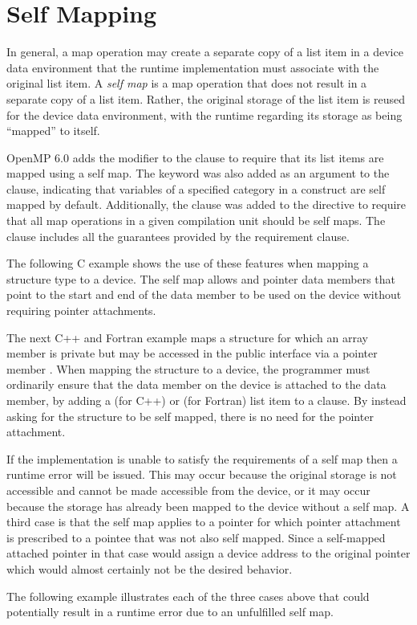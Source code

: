 \section{Self Mapping}
\label{sec:self_mapping}


In general, a map operation may create a separate copy of a list item in a
device data environment that the runtime implementation must associate with the
original list item. A \emph{self map} is a map operation that does not result in a
separate copy of a list item. Rather, the original storage of the list item is
reused for the device data environment, with the runtime regarding its storage
as being ``mapped'' to itself.

OpenMP 6.0 adds the  modifier to the  clause to require
that its list items are mapped using a self map.  The  keyword was
also added as an argument to the  clause, indicating that
variables of a specified category in a  construct are self mapped
by default. Additionally, the  clause was added to the
 directive to require that all map operations in a given
compilation unit should be self maps. The  clause includes all
the guarantees provided by the  requirement clause.

The following C example shows the use of these features when mapping a structure
type to a device. The self map allows  and  pointer
data members that point to the start and end of the  data member to
be used on the device without requiring pointer attachments.


The next C++ and Fortran example maps a structure for which an array member
 is private but may be accessed in the public interface via a
pointer member . When mapping the structure to a device, the
programmer must ordinarily ensure that the  data member on the device
is attached to the  data member, by adding a 
(for C++) or  (for Fortran) list item to a 
clause. By instead asking for the structure to be self mapped, there is no need
for the pointer attachment.


If the implementation is unable to satisfy the requirements of a self map then
a runtime error will be issued. This may occur because the original storage is
not accessible and cannot be made accessible from the device, or it may occur
because the storage has already been mapped to the device without a self map. A
third case is that the self map applies to a pointer for which pointer
attachment is prescribed to a pointee that was not also self mapped. Since a
self-mapped attached pointer in that case would assign a device address to the
original pointer which would almost certainly not be the desired behavior.

The following example illustrates each of the three cases above that could
potentially result in a runtime error due to an unfulfilled self map.


